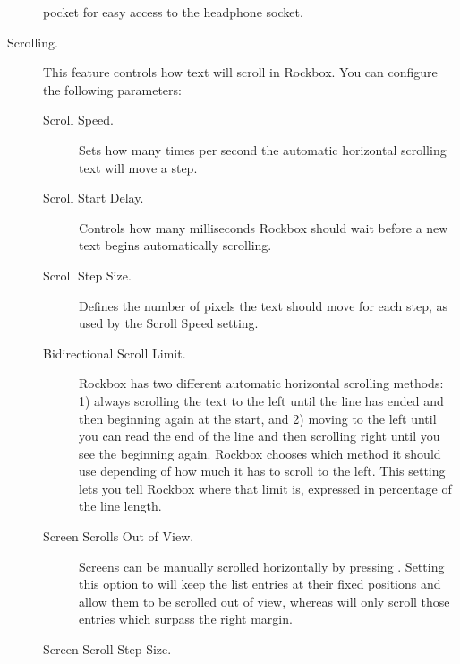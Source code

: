 \begin{description}
{\begin{description}
         pocket for easy access to the headphone socket.
    \end{description}
  }
%
  \item[Scrolling.]
    This feature controls how text will scroll in Rockbox. You can configure
    the following parameters:
    \begin{description}
    \item[Scroll Speed.]
      Sets how many times per second the automatic horizontal scrolling text
      will move a step.
    \item[Scroll Start Delay.]
      Controls how many milliseconds Rockbox should wait before a new
      text begins automatically scrolling.
      \item[Scroll Step Size.]
        Defines the number of pixels the text should move for each step, as used
        by the Scroll Speed setting.
    \item[Bidirectional Scroll Limit.]
      Rockbox has two different automatic horizontal scrolling methods: 1) always
      scrolling the text to the left until the line has ended and then beginning
      again at the start, and 2) moving to the left until you can read the end of
      the line and then scrolling right until you see the beginning again.
      Rockbox chooses which method it should use depending of how much it has to
      scroll to the left. This setting lets you tell Rockbox where that limit
      is, expressed in percentage of the line length.
    \item[Screen Scrolls Out of View.]
      Screens can be manually scrolled horizontally by pressing
      .
      Setting this option to 
      will keep the list entries at their fixed positions and allow them to be
      scrolled out of view, whereas  will only scroll those entries
      which surpass the right margin.
    \item[Screen Scroll Step Size.]

\end{description}
\end{description}
